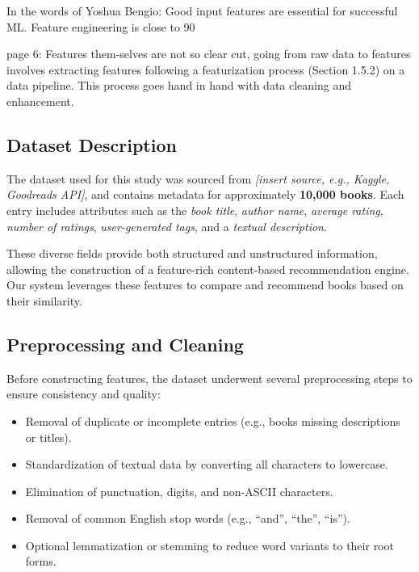 In the words of Yoshua Bengio: 
Good input features are essential for successful ML. Feature engineering is close to
90%

page 6:
Features them-selves are not so clear cut, going from raw data to features involves extracting
features following a featurization process (Section 1.5.2) on a data pipeline.
This process goes hand in hand with data cleaning and enhancement.



\subsection{Dataset Description}

The dataset used for this study was sourced from \textit{[insert source, e.g., Kaggle, Goodreads API]}, and contains metadata for approximately \textbf{10,000 books}. Each entry includes attributes such as the \textit{book title}, \textit{author name}, \textit{average rating}, \textit{number of ratings}, \textit{user-generated tags}, and a \textit{textual description}.

These diverse fields provide both structured and unstructured information, allowing the construction of a feature-rich content-based recommendation engine. Our system leverages these features to compare and recommend books based on their similarity.

\subsection{Preprocessing and Cleaning}

Before constructing features, the dataset underwent several preprocessing steps to ensure consistency and quality:

\begin{itemize}
	\item Removal of duplicate or incomplete entries (e.g., books missing descriptions or titles).
	\item Standardization of textual data by converting all characters to lowercase.
	\item Elimination of punctuation, digits, and non-ASCII characters.
	\item Removal of common English stop words (e.g., ``and'', ``the'', ``is'').
	\item Optional lemmatization or stemming to reduce word variants to their root forms.
\end{itemize}

